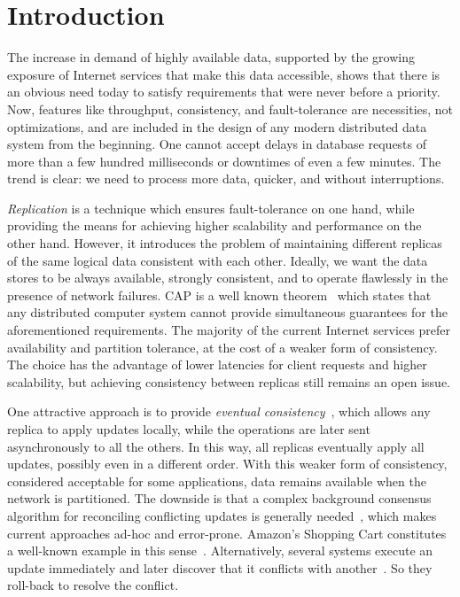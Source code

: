 \section{Introduction}
\label{sec:introduction}

The increase in demand of highly available data, supported by the growing
exposure of Internet services that make this data accessible, shows that there
is an obvious need today to satisfy requirements that were never before a priority.
Now, features like throughput, consistency, and fault-tolerance are necessities,
not optimizations, and are included in the design of any modern distributed data
system from the beginning. One cannot accept delays in database requests of more
than a few hundred milliseconds or downtimes of even a few minutes. The trend is
clear: we need to process more data, quicker, and without interruptions.

\textit{Replication} is a technique which ensures fault-tolerance on one hand,
while providing the means for achieving higher scalability and performance on the
other hand. However, it introduces the problem of maintaining different replicas
of the same logical data consistent with each other. Ideally, we want the data
stores to be always available, strongly consistent, and to operate flawlessly in
the presence of network failures. CAP is a well known
theorem~\cite{Gilbert:2002:BCF:564585.564601} which states that any distributed
computer system cannot provide simultaneous guarantees for the aforementioned
requirements. The majority of the current Internet services prefer availability
and partition tolerance, at the cost of a weaker form of consistency. The choice
has the advantage of lower latencies for client requests and higher scalability,
but achieving consistency between replicas still remains an open issue.

One attractive approach is to provide \textit{eventual
consistency}~\cite{DBLP:journals/queue/Vogels08a,Saito:2005:OR:1057977.1057980},
which allows any replica to apply updates locally, while the operations are
later sent asynchronously to all the others. In this way, all replicas
eventually apply all updates, possibly even in a different order. With this
weaker form of consistency, considered acceptable for some applications, data
remains available when the network is partitioned. The downside is that a
complex background consensus algorithm for reconciling conflicting updates is
generally needed~\cite{Terry:1995:MUC:224056.224070}, which makes current
approaches ad-hoc and error-prone. Amazon's Shopping Cart constitutes a
well-known example in this sense~\cite{DeCandia:2007:DAH:1294261.1294281}.
Alternatively, several systems execute an update immediately and later discover
that it conflicts with another~\cite{Terry:1995:MUC:224056.224070}. So they
roll-back to resolve the conflict.

